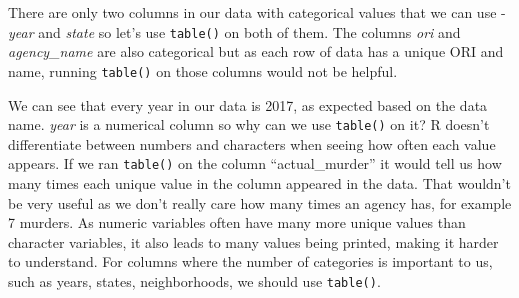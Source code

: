 \documentclass[
]{krantz}
\makeatletter
\newenvironment{Shaded}{\begin{snugshade}}{\end{snugshade}}
\newcommand{\CommentTok}[1]{\textcolor[rgb]{0.37,0.37,0.37}{\textit{#1}}}
\newcommand{\FunctionTok}[1]{\textcolor[rgb]{0,0,0}{#1}}
\newcommand{\NormalTok}[1]{#1}
\newcommand{\SpecialCharTok}[1]{\textcolor[rgb]{0,0,0}{#1}}
\newenvironment{kframe}{%
\medskip{}
\setlength{\fboxsep}{.8em}
 \def\at@end@of@kframe{}%
 \ifinner\ifhmode%
  \def\at@end@of@kframe{\end{minipage}}%
  \begin{minipage}{\columnwidth}%
 \fi\fi%
 \def\FrameCommand##1{\hskip\@totalleftmargin \hskip-\fboxsep
 \colorbox{shadecolor}{##1}\hskip-\fboxsep
     \hskip-\linewidth \hskip-\@totalleftmargin \hskip\columnwidth}%
 \MakeFramed {\advance\hsize-\width
   \@totalleftmargin\z@ \linewidth\hsize
   \@setminipage}}%
 {\par\unskip\endMakeFramed%
 \at@end@of@kframe}
\renewenvironment{Shaded}{\begin{kframe}}{\end{kframe}}
\makeatother
\begin{document}
\begin{Shaded}
\end{Shaded}

There are only two columns in our data with categorical
values that we can use - \emph{year} and \emph{state} so
let's use \texttt{table()} on both of them. The columns
\emph{ori} and \emph{agency\_name} are also categorical but
as each row of data has a unique ORI and name, running
\texttt{table()} on those columns would not be helpful.

\begin{Shaded}
\end{Shaded}

We can see that every year in our data is 2017, as expected
based on the data name. \emph{year} is a numerical column so
why can we use \texttt{table()} on it? R doesn't
differentiate between numbers and characters when seeing how
often each value appears. If we ran \texttt{table()} on the
column ``actual\_murder'' it would tell us how many times
each unique value in the column appeared in the data. That
wouldn't be very useful as we don't really care how many
times an agency has, for example 7 murders. As numeric
variables often have many more unique values than character
variables, it also leads to many values being printed,
making it harder to understand. For columns where the number
of categories is important to us, such as years, states,
neighborhoods, we should use \texttt{table()}.
\end{document}
